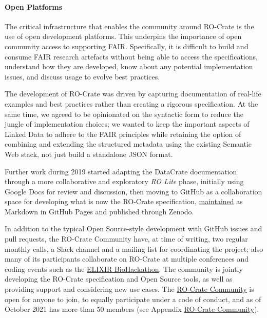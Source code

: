 \hypertarget{open-platforms}{%
\paragraph{Open Platforms}\label{open-platforms}}

The critical infrastructure that enables the community around RO-Crate
is the use of open development platforms. This underpins the importance
of open community access to supporting FAIR. Specifically, it is
difficult to build and consume FAIR research artefacts without being
able to access the specifications, understand how they are developed,
know about any potential implementation issues, and discuss usage to
evolve best practices.

The development of RO-Crate was driven by capturing documentation of
real-life examples and best practices rather than creating a rigorous
specification. At the same time, we agreed to be opinionated on the
syntactic form to reduce the jungle of implementation choices; we wanted
to keep the important aspects of Linked Data to adhere to the FAIR
principles while retaining the option of combining and extending the
structured metadata using the existing Semantic Web stack, not just
build a standalone JSON format.

Further work during 2019 started adapting the DataCrate documentation
through a more collaborative and exploratory \emph{RO Lite} phase,
initially using Google Docs for review and discussion, then moving to
GitHub as a collaboration space for developing what is now the RO-Crate
specification,
\href{https://github.com/researchobject/ro-crate/}{maintained} as
Markdown in GitHub Pages and published through Zenodo.

In addition to the typical Open Source-style development with GitHub
issues and pull requests, the RO-Crate Community have, at time of
writing, two regular monthly calls, a Slack channel and a mailing list
for coordinating the project; also many of its participants collaborate
on RO-Crate at multiple conferences and coding events such as the
\href{https://biohackathon-europe.org/}{ELIXIR BioHackathon}. The
community is jointly developing the RO-Crate specification and Open
Source tools, as well as providing support and considering new use
cases. The
\href{https://www.researchobject.org/ro-crate/community}{RO-Crate
Community} is open for anyone to join, to equally participate under a
code of conduct, and as of October 2021 has more than 50 members (see
Appendix \protect\hyperlink{communitylist}{RO-Crate Community}).

